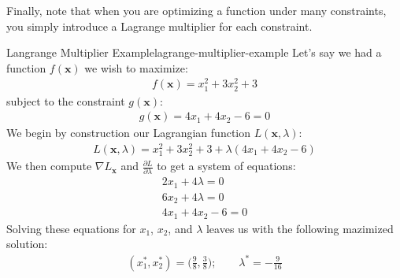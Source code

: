 
Finally, note that when you are optimizing a function under many constraints, you simply introduce a Lagrange multiplier for each constraint.

\begin{example}{Langrange Multiplier Example}{lagrange-multiplier-example}
	Let's say we had a function $f(\textbf{x})$ we wish to maximize:
	\begin{align*}
		f(\textbf{x}) = x_{1}^{2} + 3x_{2}^{2} + 3
	\end{align*}
	subject to the constraint $g(\textbf{x})$:
	\begin{align*}
		g(\textbf{x}) = 4x_{1} + 4x_{2} - 6 = 0
	\end{align*}
	We begin by construction our Lagrangian function $L(\textbf{x}, \lambda)$:
	\begin{align*}
		L(\textbf{x}, \lambda) = x_{1}^{2} + 3x_{2}^{2} + 3 + \lambda (4x_{1} + 4x_{2} - 6)
	\end{align*}
	We then compute $\nabla L_{\textbf{x}}$ and $\frac{\partial L}{\partial \lambda}$ to get a system of equations:
	\begin{align*}
		2x_{1} + 4\lambda = 0 \\
		6x_{2} + 4\lambda = 0 \\
		4x_{1} + 4x_{2} - 6 = 0
	\end{align*}
	Solving these equations for $x_{1}$, $x_{2}$, and $\lambda$ leaves us with the following mazimized solution:
	\begin{align*}
		(x_{1}^{*}, x_{2}^{*}) = \bigg(\frac{9}{8}, \frac{3}{8}\bigg); \qquad \lambda^{*} = -\frac{9}{16}
	\end{align*}
\end{example}

